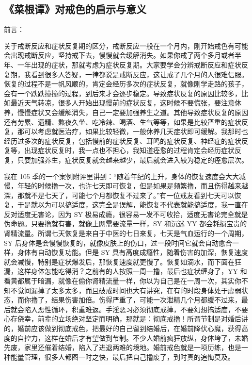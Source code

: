 \subsection{《菜根谭》对戒色的启示与意义}

前言：

关于戒断反应和症状反复期的区分，戒断反应一般在一个月内，刚开始戒色有可能会出现戒断反应，坚持戒下去，慢慢就会缓解消失。如果你戒了两个多月或者半年、一年出现的症状，那就考虑为症状反复期。大家要学会分辨戒断反应和症状反复期，我看到很多人答疑，一律都说是戒断反应，这让戒了几个月的人很难信服。恢复的过程不是一帆风顺的，肯定会经历多次的症状反复，就像刚学走路的孩子，会有一个跌跌撞撞的过程，到后来才会逐步稳定。导致症状反复的原因比较多，比如最近天气转凉，很多人开始出现慢前的症状反复，这时候不要慌张，要注意休养，慢慢症状又会缓解消失，自己一定要加强养生之道。其他导致症状反复的原因还有劳累、遗精、熬夜久坐、吃冷辣、喝酒、生气等等，如果是比较严重的症状反复，那可以考虑就医治疗，如果比较轻微，一般休养几天症状即可缓解。我那时也经历过多次的症状反复，包括慢前的症状反复、耳鸣的症状反复、神经症的症状反复等，出现症状反复时，我一点也不担心，我知道痊愈的过程肯定会经历症状反复，只要加强养生，症状反复就会越来越少，最后就会进入较为稳定的痊愈层次。

我在 105 季的一个案例附评里讲到：“随着年纪的上升，身体的恢复速度会大大减慢，年轻的时候撸一次，也许七天即可恢复，但是如果是频繁撸，而且伤得越来越深，那就不是七天了，可能七个月都恢复不过来了。”有一位戒友看到七天可以恢复，于是就以为可以搞适度，这完全是误解，能恢复不代表就能搞适度，我一直在反对适度无害论，因为 SY 极易成瘾，很容易一发不可收拾，适度无害论完全就是伪命题。只要撸就有害，就像上网需要流量一样，SY 和沉迷 YY 都会耗损宝贵的肾精流量。所谓七天恢复是来自于中医的七日来复，七天是气血运行的一个周期，SY 后身体是会慢慢恢复的，就像皮肤上的伤口，过一段时间它就会自动愈合一样，身体有自动恢复功能。但是 SY 具有高度成瘾性，随着伤害的加深，恢复速度就会减慢，特别是症状爆发后，那恢复速度就更慢了。恢复如滴水，而下面在狂漏，这样身体怎能吃得消？之前有的人按照一周一撸，最后也症状缠身了，YY 和看黄都属于暗漏，就像在偷你肾精流量一样，你以为自己是在一周一次，其实你不知不觉间漏掉了太多太多，而且破戒时间也大有讲究，在有的时段身体处于虚弱状态，而你撸了，结果伤害加倍。伤得严重了，可能一次泄精几个月都缓不过来，最后就会陷入恶性循环，积重难返。手淫恶习必须彻底戒掉，不要幻想搞适度，不要心存侥幸，前辈的立场绝对坚定而明确，那就是：彻底戒撸！所谓节制是对婚后讲的，婚前应该做到彻底戒色，把最好的自己留到结婚后，在婚前降伏心魔，获得高度的自控力，这样在婚后才有望做到节制。不少人婚前疯狂放纵，身体垮了，未婚先废，家里还催着结婚，陷入了进退两难的境地。婚前戒色就是一项历练，也是一种能量管理，很多人都图一时之快，最后把自己撸废了，到时真的追悔莫及。

